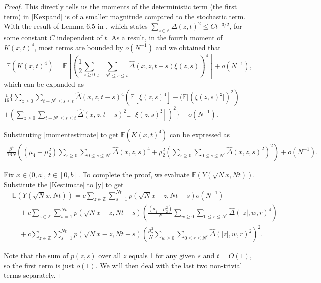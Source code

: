 \documentclass[10pt]{article}
\begin{document}
\begin{proof}
This directly tells us the moments of the deterministic term (the first term) in \eqref{Kexpand} is of a smaller magnitude compared to the stochastic term. With the result of Lemma 6.5 in \cite{adhikari2022invariance}, which states $\sum_{z \in \mathbb{Z}} \Delta(z,t)^2 \leq Ct^{-3/2}$, for some constant $C$ independent of $t$. As a result, in the fourth moment of $K(x, t)^{4}$, most terms are bounded by $o\left(N^{-1}\right)$ and we obtained that
\begin{equation}
    \mathbb{E}\left(K(x, t)^{4}\right)=   \mathbb{E}[(\frac{1}{2} \sum_{z \geq 0} \sum_{t-N^{\epsilon} \leq s \leq t} \hat{\Delta}(x,z, t-s) \xi(z,s))^{4}]+o(N^{-1}),
\end{equation}
which can be expanded as $\frac{1}{16} \{\sum_{z \geq 0} \sum_{t-N^{\epsilon} \leq s \leq t} \hat{\Delta}(x, z, t-s)^{4}\left(\mathbb{E}[\xi(z, s)^{4}]-(\mathbb{E}[(\xi(z, s)^{2}])^2\right)$\\ $+\left(\sum_{z \geq 0 } \sum_{t-N^{\epsilon} \leq s \leq t} \hat{\Delta}(x, z, t-s)^{2} \mathbb{E}[\xi(z, s)^{2}]\right)^{2}\}+o(N^{-1})$.

Substituting \eqref{momentestimate} to get $\mathbb{E}\left(K(x, t)^{4}\right)$ can be expressed as
\begin{align} \label{Kestimate}
    \frac{\beta^4}{16N} ((\mu_4-\mu_2^2) \sum_{z \geq 0} \sum_{0 \leq s \leq N^{\epsilon}} \hat{\Delta}(x, z, s)^{4}+\mu_2^2(\sum_{z \geq 0 } \sum_{0 \leq s \leq N^{\epsilon}} \hat{\Delta}(x, z, s)^{2})^{2})+o(N^{-1}).
\end{align}


Fix $x \in (0, a] $, $t \in [0,b]$. To complete the proof, we evaluate $\mathbb{E}(Y(\sqrt{N}x, Nt))$. Substitute the \eqref{Kestimate} to \eqref{y} to get 
\begin{align} 
    &\mathbb{E}(Y(\sqrt{N}x, Nt))=c\sum_{z \in \mathbb{Z}} \sum_{s=1}^{Nt} p(\sqrt{N}x-z,Nt-s)o\left(N^{-1}\right)\\
    & \quad +c\sum_{z \in \mathbb{Z}} \sum_{s=1}^{Nt} p(\sqrt{N}x-z, Nt-s)(\frac{\left(\mu_4-\mu_2^2\right)}{N} \sum_{w \geq 0} \sum_{0 \leq r \leq N^{\epsilon}} \hat{\Delta}(|z|, w, r)^{4}) \label{first_term_y}\\
    & \quad + c\sum_{z \in \mathbb{Z}} \sum_{s=1}^{Nt} p(\sqrt{N}x-z, Nt-s)(\frac{\mu_2^2}{N}\sum_{w \geq 0 } \sum_{0 \leq r \leq N^{\epsilon}} \hat{\Delta}(|z|, w, r)^{2} )^{2}. \label{second_term_y}
\end{align}


Note that the sum of $p(z, s)$ over all $z$ equals 1 for any given $s$ and $t=O(1)$, so the first term is just $o(1)$. We will then deal with the last two non-trivial terms separately. 


\end{proof}
\end{document}
